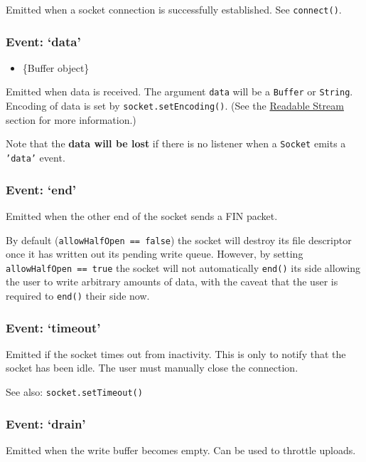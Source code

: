 Emitted when a socket connection is successfully established. See
\texttt{connect()}.

\subsubsection{Event: `data'}

\begin{itemize}
\item
  \{Buffer object\}
\end{itemize}

Emitted when data is received. The argument \texttt{data} will be a
\texttt{Buffer} or \texttt{String}. Encoding of data is set by
\texttt{socket.setEncoding()}. (See the
\href{stream.html\#stream\_readable\_stream}{Readable Stream} section
for more information.)

Note that the \textbf{data will be lost} if there is no listener when a
\texttt{Socket} emits a \texttt{'data'} event.

\subsubsection{Event: `end'}

Emitted when the other end of the socket sends a FIN packet.

By default (\texttt{allowHalfOpen == false}) the socket will destroy its
file descriptor once it has written out its pending write queue.
However, by setting \texttt{allowHalfOpen == true} the socket will not
automatically \texttt{end()} its side allowing the user to write
arbitrary amounts of data, with the caveat that the user is required to
\texttt{end()} their side now.

\subsubsection{Event: `timeout'}

Emitted if the socket times out from inactivity. This is only to notify
that the socket has been idle. The user must manually close the
connection.

See also: \texttt{socket.setTimeout()}

\subsubsection{Event: `drain'}

Emitted when the write buffer becomes empty. Can be used to throttle
uploads.

